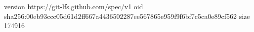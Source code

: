 version https://git-lfs.github.com/spec/v1
oid sha256:00eb93ccc05d61d2ff667a4436502287ee567865e959f9f6bf7c5ca0e89cf562
size 174916
